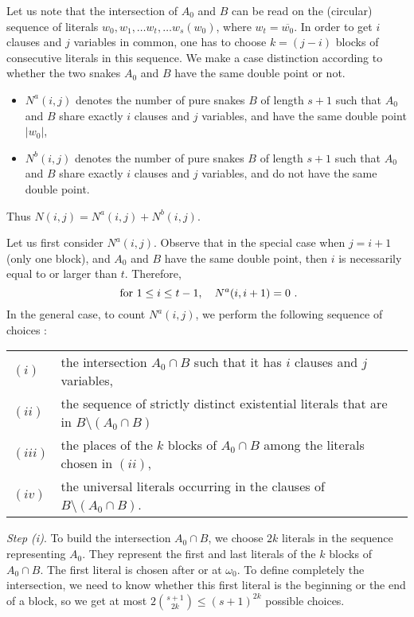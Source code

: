 \documentclass[aop,noinfoline]{imsart}
\renewcommand{\Box}{{\vrule width0.6ex height1em depth0cm}}
\newenvironment{proof}{\noindent{\bf Proof:}}{\hfill \Box}
\newcommand{\negate}[1]{\overline{#1}}
\begin{document}
\begin{proof}
Let us note that the intersection of $A_0$ and $B$ can be read on the (circular) sequence of literals
 $w_0, w_1,\ldots w_t, \ldots w_s (w_0)$, where $w_t=\negate{w_0}$.  In order to get $i$ clauses and $j$ variables in common, one has to choose $k=(j-i)$ blocks of consecutive literals in this sequence. 
We make a case distinction according to whether the two snakes  $A_0$ and $B$ have the same double point or not.
\begin{itemize}
 \item $N^{a}(i,j)$ denotes the  number of pure snakes $B$ of length $s+1$ such
that  $A_0$ and $B$ share exactly  $i$ clauses and $j$ variables, and have the same double point $\vert w_0\vert$,
\item $N^{b}(i,j)$ denotes the  number of pure snakes $B$ of length $s+1$ such
that  $A_0$ and $B$ share exactly  $i$ clauses and $j$ variables, and do not have    the same double point.\\
\end{itemize}
Thus  $N(i,j)=N^{a}(i,j)+N^{b}(i,j).$ 

Let us  first consider $N^{a}(i,j).$
Observe that in the special case when $j=i+1$ (only one block), and $A_0$ and $B$ have the same double point, then $i$ is necessarily equal to or larger than $t$. Therefore,  
\begin{equation}\label{eqn:boundN0}
\hbox{ for } 1\le i\le t-1, \quad N^{a}(i,i+1)=0\ .
\end{equation} 
In the general case, to count $N^{a}(i,j)$, we
perform the following sequence of choices :

\begin{tabular}{ll}
$(i)$&  the intersection $A_0\cap B$ such that it has $i$ clauses and $j$ variables,\\
$(ii)$& the sequence of strictly distinct existential literals that are  in $B\setminus (A_0\cap B)$\\
$(iii)$&  the places of the $k$ blocks of $A_0\cap
B$ among the literals chosen in $(ii)$,\\
$(iv)$&  the universal literals occurring in  the clauses of $B\setminus (A_0\cap B)$.
\end{tabular}

\emph{Step (i)}. To build the intersection $A_0\cap B$, we choose $2k$
literals  in the sequence representing  $A_0$. They represent the first and last literals of the
$k$ blocks of $A_0\cap B$. The first literal is chosen after or at $\omega_0$. 
To
define completely the intersection, we need to know whether this first
literal is the beginning or the end of a block, so we get
at most $2\binom{s+1}{2k}\le (s+1)^{2k}$ possible choices.


\end{proof}
\end{document}
